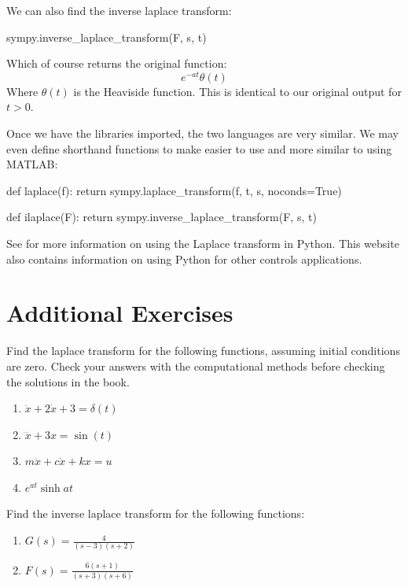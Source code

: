 We can also find the inverse \gls{laplace transform}:
\begin{pythonscript}{}
 sympy.inverse_laplace_transform(F, s, t)
\end{pythonscript}

Which of course returns the original function:
$$e^{-at}\theta(t)$$
Where $\theta(t)$ is the Heaviside function. This is identical to our original output for $t>0$.

Once we have the libraries imported, the two languages are very similar. We may even define shorthand functions to make easier to use and more similar to using MATLAB:
\begin{pythonscript}{}
def laplace(f):
    return sympy.laplace_transform(f, t, s, noconds=True)

def ilaplace(F):
    return sympy.inverse_laplace_transform(F, s, t)
\end{pythonscript}

See \cite{sandrock_3_2018} for more information on using the Laplace transform in Python. This website also contains information on using Python for other controls applications.

\section{Additional Exercises}
\begin{exercise}\label{exer_laplace_practice}
    Find the \gls{laplace transform} for the following functions, assuming initial conditions are zero. Check your answers with the computational methods before checking the solutions in the book.
    \begin{enumerate}
        \item $\ddot{x}+2\dot{x}+3=\delta(t)$
        \item $\dddot{x}+3x=\sin(t)$
        \item $m\ddot{x}+c\dot{x}+kx=u$
        \item $e^{at}\sinh{at}$
    \end{enumerate}
\end{exercise}

\begin{exercise}
    Find the inverse \gls{laplace transform} for the following functions:
    \begin{enumerate}
        \item $G(s)=\frac{4}{(s-3)(s+2)}$
        \item $F(s)=\frac{6(s+1)}{(s+3)(s+6)}$
    \end{enumerate}
\end{exercise}


